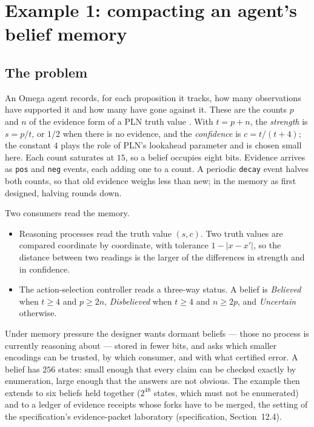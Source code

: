 \documentclass[11pt]{article}
\newcommand{\code}[1]{\texttt{#1}}
\newcommand{\spec}[1]{specification, Section~#1}
\theoremstyle{definition}
\theoremstyle{plain}
\begin{document}
\section{Example 1: compacting an agent's belief memory}\label{sec:ex1}

\subsection{The problem}

An Omega agent records, for each proposition it tracks, how many observations have supported it
and how many have gone against it. These are the counts $p$ and $n$ of the evidence form of a PLN
truth value \cite{pln}. With $t=p+n$, the \emph{strength} is $s=p/t$, or $1/2$ when there is no
evidence, and the \emph{confidence} is $c=t/(t+4)$; the constant $4$ plays the role of PLN's
lookahead parameter and is chosen small here. Each count saturates at $15$, so a belief occupies
eight bits. Evidence arrives as \code{pos} and \code{neg} events, each adding one to a count. A
periodic \code{decay} event halves both counts, so that old evidence weighs less than new; in the
memory as first designed, halving rounds down.

Two consumers read the memory.
\begin{itemize}
\item Reasoning processes read the truth value $(s,c)$. Two truth values are compared coordinate
by coordinate, with tolerance $1-|x-x'|$, so the distance between two readings is the larger of
the differences in strength and in confidence.
\item The action-selection controller reads a three-way status. A belief is \emph{Believed} when
$t\ge4$ and $p\ge2n$, \emph{Disbelieved} when $t\ge4$ and $n\ge2p$, and \emph{Uncertain}
otherwise.
\end{itemize}
Under memory pressure the designer wants dormant beliefs --- those no process is currently
reasoning about --- stored in fewer bits, and asks which smaller encodings can be trusted, by which
consumer, and with what certified error. A belief has $256$ states: small enough that every claim
can be checked exactly by enumeration, large enough that the answers are not obvious. The example
then extends to six beliefs held together ($2^{48}$ states, which must not be enumerated) and to
a ledger of evidence receipts whose forks have to be merged, the setting of the specification's
evidence-packet laboratory (\spec{12.4}).
\end{document}
